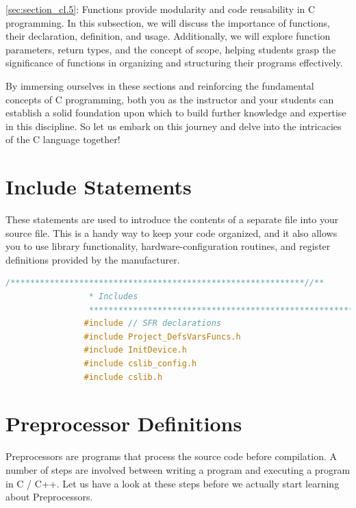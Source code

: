     \autoref{sec:section_cl.5}:
    Functions provide modularity and code reusability in C programming. In this subsection, we will discuss the importance of functions, their declaration, definition, and usage. Additionally, we will explore function parameters, return types, and the concept of scope, helping students grasp the significance of functions in organizing and structuring their programs effectively.
    
    By immersing ourselves in these sections and reinforcing the fundamental concepts of C programming, both you as the instructor and your students can establish a solid foundation upon which to build further knowledge and expertise in this discipline. So let us embark on this journey and delve into the intricacies of the C language together!
    
    \section{Include Statements} \label{sec:section_cl.1}
        These statements are used to introduce the contents of a separate file into your source file. This is a handy way to keep your code organized, and it also allows you to use library functionality, hardware-configuration routines, and register definitions provided by the manufacturer.
    
            \begin{lstlisting}[style=mystyle_c, language=c, breaklines]
                /************************************************************//**
                 * Includes
                 ***************************************************************/
                #include // SFR declarations
                #include Project_DefsVarsFuncs.h
                #include InitDevice.h
                #include cslib_config.h
                #include cslib.h
            \end{lstlisting}

    \section{Preprocessor Definitions} \label{sec:section_cl.2}

        Preprocessors are programs that process the source code before compilation. A number of steps are involved between writing a program and executing a program in C / C++. Let us have a look at these steps before we actually start learning about Preprocessors.

